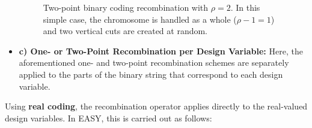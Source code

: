 \begin{itemize}
\begin{figure}[h!]
\begin{minipage}[b]{1.0\linewidth}
 \centering
\end{minipage}
\caption{Two-point binary coding recombination with $\rho=2$. In this simple case, the chromosome is handled as a whole ($\rho-1 = 1$) and two vertical cuts are created at random.} 
\label{2px}
\end{figure}

\FloatBarrier
\item[]{\bf c) One- or Two-Point Recombination per Design Variable:} Here, the aforementioned one- and two-point recombination schemes are separately applied to the parts  of the binary string that correspond to each design variable.  
\end{itemize}
  
Using {\bf real coding}, the recombination operator applies directly to the real-valued design variables. In EASY, this is carried out as follows:  

